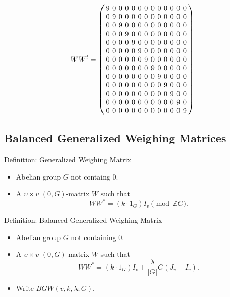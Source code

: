 \documentclass{beamer}
\newcommand{\abs}[1]{|#1|}
\begin{document}
\begin{frame}
  \[
    WW^t = 
    \arraycolsep=2.0pt\def\arraystretch{1.0}
    \left(
      \begin{array}{ccccccccccccc}
        9&0&0&0&0&0&0&0&0&0&0&0&0\\
        0&9&0&0&0&0&0&0&0&0&0&0&0\\
        0&0&9&0&0&0&0&0&0&0&0&0&0\\
        0&0&0&9&0&0&0&0&0&0&0&0&0\\
        0&0&0&0&9&0&0&0&0&0&0&0&0\\
        0&0&0&0&0&9&0&0&0&0&0&0&0\\
        0&0&0&0&0&0&9&0&0&0&0&0&0\\
        0&0&0&0&0&0&0&9&0&0&0&0&0\\
        0&0&0&0&0&0&0&0&9&0&0&0&0\\
        0&0&0&0&0&0&0&0&0&9&0&0&0\\
        0&0&0&0&0&0&0&0&0&0&9&0&0\\
        0&0&0&0&0&0&0&0&0&0&0&9&0\\
        0&0&0&0&0&0&0&0&0&0&0&0&9\\
      \end{array}
    \right)
  \]
\end{frame}


\subsection{Balanced Generalized Weighing Matrices}

\begin{frame}

  \begin{block}{Definition: Generalized Weighing Matrix}
    \begin{itemize}
    \item Abelian group $G$ not containg $0$.
    \item A $v \times v$ $(0,G)$-matrix $W$ such that
      \[
        WW^* = (k \cdot 1_G)I_v \pmod{\mathbb{Z}G}.
      \]
    \end{itemize}
  \end{block}

  \begin{block}{Definition: Balanced Generalized Weighing Matrix}
    \begin{itemize}
    \item Abelian group $G$ not containing $0$.
    \item A $v \times v$ $(0,G)$-matrix $W$ such that
      \[
        WW^* = (k \cdot 1_G)I_v + \frac{\lambda}{\abs{G}}G(J_v-I_v).
      \]
    \item Write $BGW(v,k,\lambda; G)$.
    \end{itemize}
  \end{block}
  
\end{frame}
\end{document}

